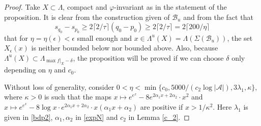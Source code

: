 \documentclass[12pt]{amsart}
\providecommand{\abs}[1]{\lvert#1\rvert}
\theoremstyle{plain} %
\theoremstyle{definition} %
\numberwithin{equation}{section}
\begin{document}
\begin{proof}
Take $X \subset \Lambda$, compact and $\varphi$-invariant as in the statement of the proposition. It is clear from the construction given of $\mathcal{B}_u$ and from the fact that
$$s_{q_0}-s_{p_0}\geq 2\lceil2/\tau\rceil (q_0 -p_0) \geq 2\lceil2/\tau\rceil=2\lceil200/\eta\rceil$$
that for $\eta=\eta(\epsilon) < \epsilon$ small enough and $x \in \Lambda ^u(X)=\Lambda(\Sigma(\mathcal{B}_u))$, the set $X_\epsilon(x)$ is neither bounded below nor bounded above. Also, because $\Lambda ^u(X)\subset \Lambda_{\max f|_X-\delta}$, the proposition will be proved if we can choose $\delta$ only depending on $\eta$ and $c_0$.


Without loss of generality, consider $0<\eta < \min \{c_0, 5000/ (c_2\log \abs{\mathcal{A}}), 3\lambda_1, \kappa \},$
where $\kappa >0$ is such that the maps $x\mapsto e^{e^x}-8e^{2\alpha_1x+2\alpha_2}\cdot x^2$  and $x\mapsto e^{e^x}-8\log x\cdot e^{2\alpha_1x+2\alpha_2} \cdot x(\alpha_1 x+\alpha_2) $  are positive if $x > 1/\kappa^2$. Here $\lambda_1$ is given in \ref{bdp2}, $\alpha_1,\alpha_2$ in \ref{expN} and $c_2$ in Lemma \ref{c_2}.


\end{proof}
\end{document}
